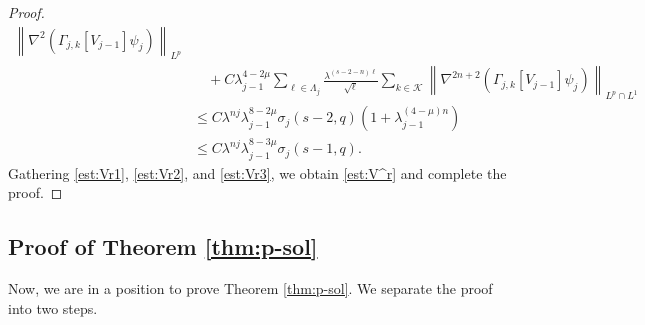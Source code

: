 \documentclass[a4paper,12pt,reqno]{amsart}
\theoremstyle{plain}
\theoremstyle{definition}
\renewcommand{\leq}{\leqslant}
\newcommand{\n}[1]{{\left\|#1\right\|}}
\renewcommand{\sp}[1]{\left(#1\right)}
\begin{document}
\begin{proof}
\begin{align}
    \n{\nabla^2(\Gamma_{j,k}[V_{j-1}]\psi_{j})}_{L^{p}}
    \\
    &\quad
    +
    C
    \lambda_{j-1}^{4-2\mu}
    \sum_{\ell\in \Lambda_j}
    \frac{\lambda^{(s-2-n)\ell}}{\sqrt{\ell}}
    \sum_{k \in \mathcal{K}}
    \n{\nabla^{2n+2}(\Gamma_{j,k}[V_{j-1}]\psi_{j})}_{L^{p} \cap L^1}
    \\
    &
    \leq 
    C
    \lambda^{nj}
    \lambda_{j-1}^{8-2\mu}
    \sigma_j(s-2,q)
    \sp{
    1+\lambda_{j-1}^{(4-\mu)n}
    }
    \\
    &
    \leq 
    C
    \lambda^{nj}
    \lambda_{j-1}^{8-3\mu}
    \sigma_j(s-1,q).\label{est:Vr3}
\end{align}
Gathering \eqref{est:Vr1}, \eqref{est:Vr2}, and \eqref{est:Vr3},
we obtain \eqref{est:V^r}
and complete the proof.
\end{proof}


\subsection{Proof of Theorem \ref{thm:p-sol}}
Now, we are in a position to prove Theorem \ref{thm:p-sol}. 
We separate the proof into two steps.
%
\end{document}
